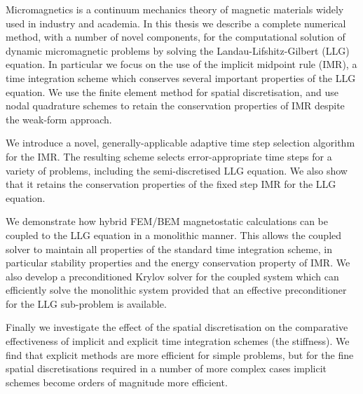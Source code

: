 Micromagnetics is a continuum mechanics theory of magnetic materials widely used in industry and academia.
In this thesis we describe a complete numerical method, with a number of novel components, for the computational solution of dynamic micromagnetic problems by solving the Landau-Lifshitz-Gilbert (LLG) equation.
In particular we focus on the use of the implicit midpoint rule (IMR), a time integration scheme which conserves several important properties of the LLG equation.
We use the finite element method for spatial discretisation, and use nodal quadrature schemes to retain the conservation properties of IMR despite the weak-form approach.

We introduce a novel, generally-applicable adaptive time step selection algorithm for the IMR.
The resulting scheme selects error-appropriate time steps for a variety of problems, including the semi-discretised LLG equation.
We also show that it retains the conservation properties of the fixed step IMR for the LLG equation.

We demonstrate how hybrid FEM/BEM magnetostatic calculations can be coupled to the LLG equation in a monolithic manner.
This allows the coupled solver to maintain all properties of the standard time integration scheme, in particular stability properties and the energy conservation property of IMR.
We also develop a preconditioned Krylov solver for the coupled system which can efficiently solve the monolithic system provided that an effective preconditioner for the LLG sub-problem is available.

Finally we investigate the effect of the spatial discretisation on the comparative effectiveness of implicit and explicit time integration schemes (\ie the stiffness).
We find that explicit methods are more efficient for simple problems, but for the fine spatial discretisations required in a number of more complex cases implicit schemes become orders of magnitude more efficient.


